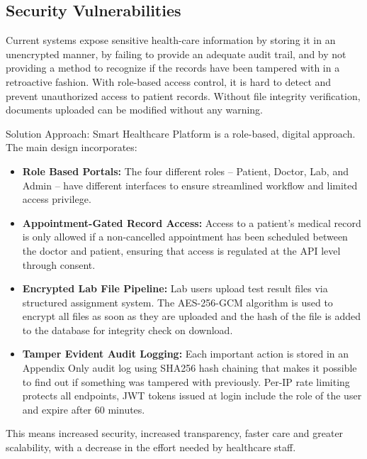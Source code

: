 \documentclass[a4paper,12pt]{report}
\begin{document}
\subsection{Security Vulnerabilities}

Current systems expose sensitive health-care information by storing it in an unencrypted manner, by failing to provide an adequate audit trail, and by not providing a method to recognize if the records have been tampered with in a retroactive fashion. With role-based access control, it is hard to detect and prevent unauthorized access to patient records. Without file integrity verification, documents uploaded can be modified without any warning.

Solution Approach: Smart Healthcare Platform is a role-based, digital approach. The main design incorporates:

\begin{itemize}
    \item \textbf{Role Based Portals:} The four different roles – Patient, Doctor, Lab, and Admin – have different interfaces to ensure streamlined workflow and limited access privilege.
    \item \textbf{Appointment-Gated Record Access:} Access to a patient's medical record is only allowed if a non-cancelled appointment has been scheduled between the doctor and patient, ensuring that access is regulated at the API level through consent.
    \item \textbf{Encrypted Lab File Pipeline:} Lab users upload test result files via structured assignment system. The AES-256-GCM algorithm is used to encrypt all files as soon as they are uploaded and the hash of the file is added to the database for integrity check on download.
    \item \textbf{Tamper Evident Audit Logging:} Each important action is stored in an Appendix Only audit log using SHA256 hash chaining that makes it possible to find out if something was tampered with previously.
    Per-IP rate limiting protects all endpoints, JWT tokens issued at login include the role of the user and expire after 60 minutes.
\end{itemize}

This means increased security, increased transparency, faster care and greater scalability, with a decrease in the effort needed by healthcare staff.

\end{document}
